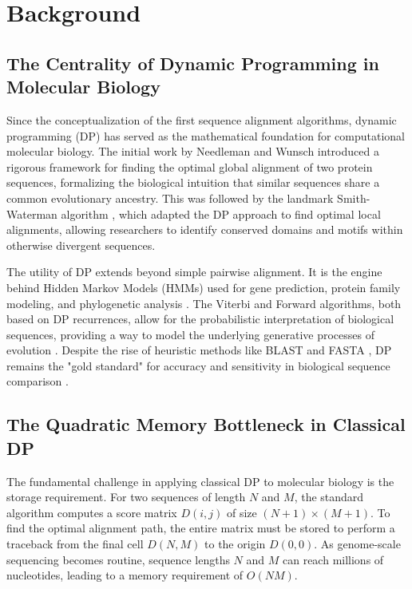 \section{Background}

\subsection{The Centrality of Dynamic Programming in Molecular Biology}
Since the conceptualization of the first sequence alignment algorithms, dynamic programming (DP) has served as the mathematical foundation for computational molecular biology. The initial work by Needleman and Wunsch \cite{Needleman1970} introduced a rigorous framework for finding the optimal global alignment of two protein sequences, formalizing the biological intuition that similar sequences share a common evolutionary ancestry. This was followed by the landmark Smith-Waterman algorithm \cite{Smith1981}, which adapted the DP approach to find optimal local alignments, allowing researchers to identify conserved domains and motifs within otherwise divergent sequences.

The utility of DP extends beyond simple pairwise alignment. It is the engine behind Hidden Markov Models (HMMs) used for gene prediction, protein family modeling, and phylogenetic analysis \cite{Durbin1998, Rabiner1989}. The Viterbi and Forward algorithms, both based on DP recurrences, allow for the probabilistic interpretation of biological sequences, providing a way to model the underlying generative processes of evolution \cite{Krogh1994, Eddy1998}. Despite the rise of heuristic methods like BLAST \cite{Altschul1990, Lipman1985} and FASTA \cite{Pearson1988}, DP remains the "gold standard" for accuracy and sensitivity in biological sequence comparison \cite{Sellers1974}.

\subsection{The Quadratic Memory Bottleneck in Classical DP}
The fundamental challenge in applying classical DP to molecular biology is the storage requirement. For two sequences of length $N$ and $M$, the standard algorithm computes a score matrix $D(i, j)$ of size $(N+1) \times (M+1)$. To find the optimal alignment path, the entire matrix must be stored to perform a traceback from the final cell $D(N, M)$ to the origin $D(0, 0)$. As genome-scale sequencing becomes routine, sequence lengths $N$ and $M$ can reach millions of nucleotides, leading to a memory requirement of $O(NM)$.

